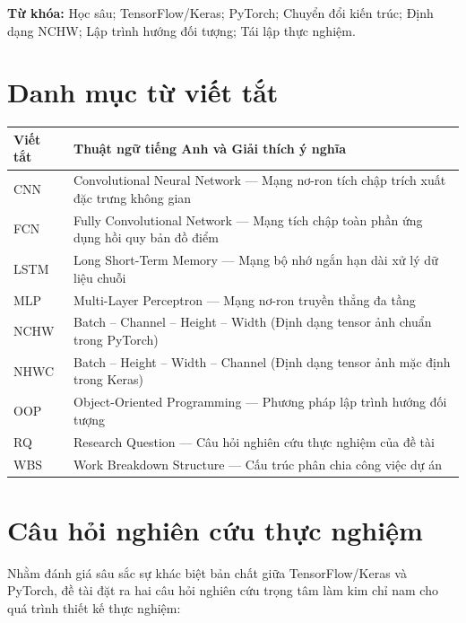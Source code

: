 \noindent\textbf{Từ khóa:} Học sâu; TensorFlow/Keras; PyTorch; Chuyển đổi kiến trúc; Định dạng NCHW; Lập trình hướng đối tượng; Tái lập thực nghiệm.

\chapter*{Danh mục từ viết tắt}
\begin{tabularx}{\textwidth}{lY}
\toprule \textbf{Viết tắt} & \textbf{Thuật ngữ tiếng Anh và Giải thích ý nghĩa} \\
\midrule
CNN & Convolutional Neural Network — Mạng nơ-ron tích chập trích xuất đặc trưng không gian \\
FCN & Fully Convolutional Network — Mạng tích chập toàn phần ứng dụng hồi quy bản đồ điểm \\
LSTM & Long Short-Term Memory — Mạng bộ nhớ ngắn hạn dài xử lý dữ liệu chuỗi \\
MLP & Multi-Layer Perceptron — Mạng nơ-ron truyền thẳng đa tầng \\
NCHW & Batch -- Channel -- Height -- Width (Định dạng tensor ảnh chuẩn trong PyTorch) \\
NHWC & Batch -- Height -- Width -- Channel (Định dạng tensor ảnh mặc định trong Keras) \\
OOP & Object-Oriented Programming — Phương pháp lập trình hướng đối tượng \\
RQ & Research Question — Câu hỏi nghiên cứu thực nghiệm của đề tài \\
WBS & Work Breakdown Structure — Cấu trúc phân chia công việc dự án \\
\bottomrule
\end{tabularx}

\chapter*{Câu hỏi nghiên cứu thực nghiệm}
Nhằm đánh giá sâu sắc sự khác biệt bản chất giữa TensorFlow/Keras và PyTorch, đề tài đặt ra hai câu hỏi nghiên cứu trọng tâm làm kim chỉ nam cho quá trình thiết kế thực nghiệm:

